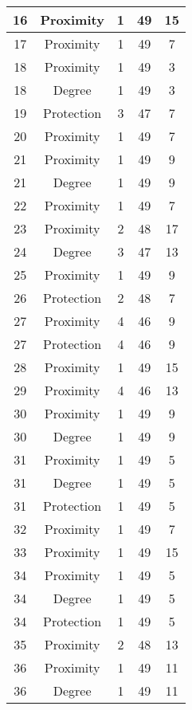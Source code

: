 \documentclass[results.tex]{subfiles}
\begin{document}
\begin{center}
\begin{tabular}{| c || c | c | c | c |}
    \hline
    16 & Proximity & 1 & 49 & 15 \\ 
    \hline
    17 & Proximity & 1 & 49 & 7 \\ 
    \hline
    18 & Proximity & 1 & 49 & 3 \\ 
    \hline
    18 & Degree & 1 & 49 & 3 \\ 
    \hline
    19 & Protection & 3 & 47 & 7 \\ 
    \hline
    20 & Proximity & 1 & 49 & 7 \\ 
    \hline
    21 & Proximity & 1 & 49 & 9 \\ 
    \hline
    21 & Degree & 1 & 49 & 9 \\ 
    \hline
    22 & Proximity & 1 & 49 & 7 \\ 
    \hline
    23 & Proximity & 2 & 48 & 17 \\ 
    \hline
    24 & Degree & 3 & 47 & 13 \\ 
    \hline
    25 & Proximity & 1 & 49 & 9 \\ 
    \hline
    26 & Protection & 2 & 48 & 7 \\ 
    \hline
    27 & Proximity & 4 & 46 & 9 \\ 
    \hline
    27 & Protection & 4 & 46 & 9 \\ 
    \hline
    28 & Proximity & 1 & 49 & 15 \\ 
    \hline
    29 & Proximity & 4 & 46 & 13 \\ 
    \hline
    30 & Proximity & 1 & 49 & 9 \\ 
    \hline
    30 & Degree & 1 & 49 & 9 \\ 
    \hline
    31 & Proximity & 1 & 49 & 5 \\ 
    \hline
    31 & Degree & 1 & 49 & 5 \\ 
    \hline
    31 & Protection & 1 & 49 & 5 \\ 
    \hline
    32 & Proximity & 1 & 49 & 7 \\ 
    \hline
    33 & Proximity & 1 & 49 & 15 \\ 
    \hline
    34 & Proximity & 1 & 49 & 5 \\ 
    \hline
    34 & Degree & 1 & 49 & 5 \\ 
    \hline
    34 & Protection & 1 & 49 & 5 \\ 
    \hline
    35 & Proximity & 2 & 48 & 13 \\ 
    \hline
    36 & Proximity & 1 & 49 & 11 \\ 
    \hline
    36 & Degree & 1 & 49 & 11 \\ 

\end{tabular}
\end{center}
\end{document}

